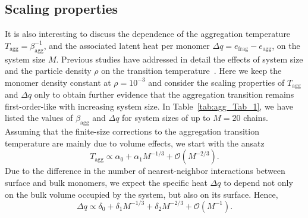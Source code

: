 \documentclass[12pt]{report}
\begin{document}
\subsection{Scaling properties}
%
It is also interesting to discuss the dependence of the aggregation temperature $ T_{\mathrm{agg}} = \beta_{\mathrm{agg}}^{-1}$, and the associated latent heat per monomer $\Delta q = e_{\mathrm{frag}} - e_{\mathrm{agg}}$, on the system size $M$. Previous studies have addressed in detail the effects of system size and the particle density $\rho$ on the transition temperature~\cite{Zieren2014,Zieren2015}. Here we keep the monomer density constant at $\rho = 10^{-3}$ and consider the scaling properties of $T_{\mathrm{agg}}$ and $\Delta q$ only to obtain further evidence that the aggregation transition remains first-order-like with increasing system size. In Table~\ref{tab:agg_Tab_1}, we have listed the values of $\beta_{\mathrm{agg}}$ and $\Delta q$ for system sizes of up to $M = 20$ chains. Assuming that the finite-size corrections to the aggregation transition temperature are mainly due to volume effects, we start with the ansatz
%
\begin{equation}
T_{\mathrm{agg}} \propto \alpha_{0} + \alpha_{1}M^{-1/3}
+\mathcal{O}(M^{-2/3}).
\end{equation}
%
Due to the difference in the number of nearest-neighbor interactions between  surface and bulk monomers, we expect the specific heat $\Delta q$ to depend not only on the bulk volume occupied by the system, but also on its surface. Hence,
%
\begin{equation}
\Delta q \propto \delta_{0} + \delta_{1}M^{-1/3} + \delta_{2}M^{-2/3} + 
\mathcal{O}(M^{-1}).
\end{equation}
%
\end{document}
